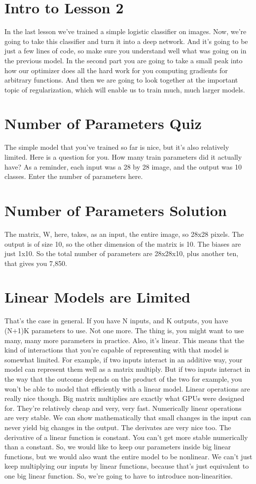\documentclass{article}
\begin{document}
\section{Intro to Lesson 2}
In the last lesson we've trained
a simple logistic classifier on images.
Now, we're going to take this classifier
and turn it into a deep network.
And it's going to be
just a few lines of code,
so make sure you understand well what
was going on in the previous model.
In the second part you are going to take
a small peak into how our optimizer does
all the hard work for you computing
gradients for arbitrary functions.
And then we are going to look
together at the important topic of
regularization, which will enable us
to train much, much larger models.
\section{Number of Parameters Quiz}
The simple model that you've trained so
far is nice, but
it's also relatively limited.
Here is a question for you.
How many train parameters
did it actually have?
As a reminder, each input was a 28 by 28
image, and the output was 10 classes.
Enter the number of parameters here.
\section{Number of Parameters Solution}
The matrix, W, here, takes, as an input,
the entire image, so 28x28 pixels.
The output is of size 10, so
the other dimension of the matrix is 10.
The biases are just 1x10.
So the total number of
parameters are 28x28x10,
plus another ten, that gives you 7,850.
\section{Linear Models are Limited}
That's the case in general.
If you have N inputs, and K outputs,
you have (N+1)K parameters to use.
Not one more.
The thing is, you might want to use
many, many more parameters in practice.
Also, it's linear.
This means that the kind of interactions
that you're capable of representing with
that model is somewhat limited.
For example, if two inputs
interact in an additive way,
your model can represent them
well as a matrix multiply.
But if two inputs interact in the way
that the outcome depends on the product
of the two for
example, you won't be able to model
that efficiently with a linear model.
Linear operations
are really nice though.
Big matrix multiplies are exactly
what GPUs were designed for.
They're relatively cheap and
very, very fast.
Numerically linear
operations are very stable.
We can show mathematically that
small changes in the input
can never yield big
changes in the output.
The derivates are very nice too.
The derivative of a linear
function is constant.
You can't get more stable
numerically than a constant.
So, we would like to keep our parameters
inside big linear functions, but
we would also want the entire
model to be nonlinear.
We can't just keep multiplying
our inputs by linear functions,
because that's just equivalent
to one big linear function.
So, we're going to have to
introduce non-linearities.
\end{document}
